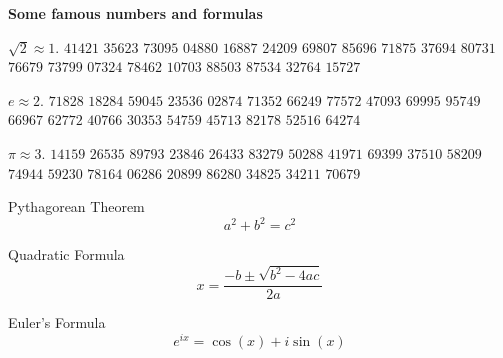 \vfill

\begin{center}\textbf{Some famous numbers and formulas}\end{center}

\begin{multicols}{2}
\(\sqrt 2 \approx 1.\)
\(41421\)
\(35623\)
\(73095\)
\(04880\)
\(16887\)
\(24209\)
\(69807\)
\(85696\)
\(71875\)
\(37694\)
\(80731\)
\(76679\)
\(73799\)
\(07324\)
\(78462\)
\(10703\)
\(88503\)
\(87534\)
\(32764\)
\(15727\)

\(e \approx 2.\)
\(71828\)
\(18284\)
\(59045\)
\(23536\)
\(02874\)
\(71352\)
\(66249\)
\(77572\)
\(47093\)
\(69995\)
\(95749\)
\(66967\)
\(62772\)
\(40766\)
\(30353\)
\(54759\)
\(45713\)
\(82178\)
\(52516\)
\(64274\)

\(\pi \approx 3.\)
\(14159\)
\(26535\)
\(89793\)
\(23846\)
\(26433\)
\(83279\)
\(50288\)
\(41971\)
\(69399\)
\(37510\)
\(58209\)
\(74944\)
\(59230\)
\(78164\)
\(06286\)
\(20899\)
\(86280\)
\(34825\)
\(34211\)
\(70679\)

\columnbreak

Pythagorean Theorem
\[a^2+b^2=c^2\]

Quadratic Formula
\[x=\frac{-b\pm\sqrt{b^2-4ac}}{2a}\]

Euler's Formula
\[e^{ix}=\cos(x)+i\sin(x)\]
\end{multicols}

\vfill

